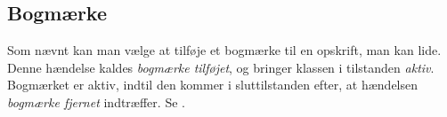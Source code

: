 \subsection{Bogmærke}
Som nævnt kan man vælge at tilføje et bogmærke til en opskrift, man kan lide. Denne hændelse kaldes \textit{bogmærke tilføjet}, og bringer klassen i tilstanden \textit{aktiv}. Bogmærket er aktiv, indtil den kommer i sluttilstanden efter, at hændelsen \textit{bogmærke fjernet} indtræffer. Se .

\begin{figure}[H]
	\centering
	\scalebox{0.8}{
	}
	\label{fig:bogmaerke-adfaerd}
\end{figure}